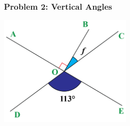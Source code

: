 \documentclass{beamer}
\begin{document}
\begin{frame}
    \frametitle{Problem 2: Vertical Angles}
\begin{center}
    \includegraphics[width=0.5\textwidth]{vertical_angles_2.png} %
\end{center}
\end{frame}
\end{document}
